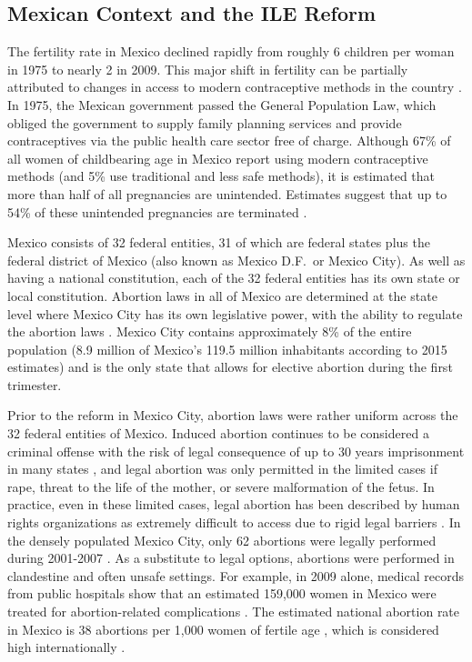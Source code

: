 \documentclass[a4paper, 11pt]{article}
\begin{document}
\begin{spacing}{2}
\section{Mexican Context and the ILE Reform}
\label{reform}
The fertility rate in Mexico declined rapidly from roughly 6 children per woman in 1975 to nearly 2 in 2009. This major shift in fertility can be partially attributed to changes in access to modern contraceptive methods in the country \citep{GIRE2009}.  In 1975, the Mexican government passed the General Population Law, which obliged the government to supply family planning services and provide contraceptives via the public health care sector free of charge. Although 67\% of all women of childbearing age in Mexico report using modern contraceptive methods%
(and 5\% use traditional and less safe methods), it is estimated that more than half of all pregnancies are unintended. Estimates suggest that up to 54\% of these unintended pregnancies are terminated \citep{GIRE2009}.

Mexico consists of 32 federal entities, 31 of which are federal states plus the federal district of Mexico (also known as Mexico D.F.\ or Mexico City).  As well as having a national constitution, each of the 32 federal entities has its own state or local constitution.  Abortion laws in all of Mexico are determined at the state level where Mexico City has its own legislative power, with the ability to regulate the abortion laws \citep{Becker}.  Mexico City contains approximately 8\% of the entire population (8.9 million of Mexico's 119.5 million inhabitants according to 2015 estimates) and is the only state that allows for elective abortion during the first trimester.  %

Prior to the reform in Mexico City, abortion laws were rather uniform across the 32 federal entities of Mexico.  Induced abortion continues to be considered a criminal offense with the risk of legal consequence of up to 30 years imprisonment in many states \citep{GIRE2009}, and legal abortion was only permitted in the limited cases if rape, threat to the life of the mother, or severe malformation of the fetus.  In practice, even in these limited cases, legal abortion has been described by human rights organizations as extremely difficult to access due to rigid legal barriers \citep{GIRE2009}. In the densely populated Mexico City, only 62 abortions were legally performed during 2001-2007 \citep{Becker}. As a substitute to legal options, abortions were performed in clandestine and often unsafe settings. For example, in 2009 alone, medical records from public hospitals show that an estimated 159,000 women in Mexico were treated for abortion-related complications \citep{GIRE2009}.  The estimated national abortion rate in Mexico is 38 abortions per 1,000 women of fertile age \citep{GIRE2009}, which is considered high internationally \citep{Becker}. 


\end{spacing}
\end{document}
